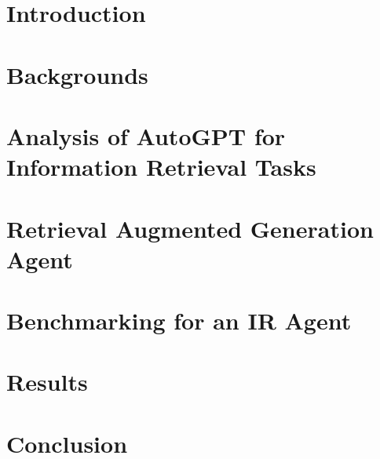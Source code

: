 \documentclass[english, version-2022-01]{uzl-thesis}
\begin{document}
\chapter{Introduction}
\label{chap:introduction}


\chapter{Backgrounds}
\label{chap:backgrounds}


\chapter{Analysis of AutoGPT for Information Retrieval Tasks}
\label{chap:autogpt}


\chapter{Retrieval Augmented Generation Agent}
\label{chap:agent}


\chapter{Benchmarking for an IR Agent}
\label{chap:benchmarks}


\chapter{Results}
\label{ch:results}


\chapter{Conclusion}
\label{ch:conclusion}

\end{document}
